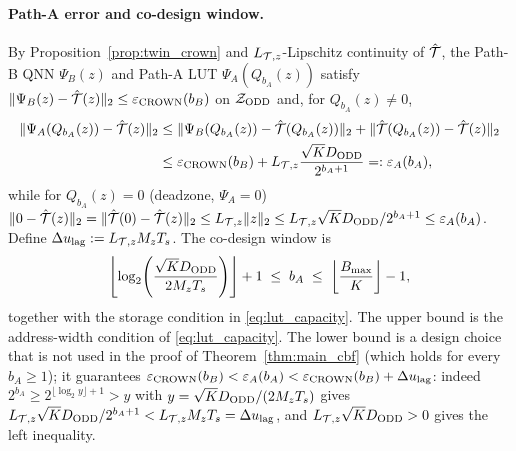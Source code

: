 \paragraph{Path-A error and co-design window.}
By Proposition~\ref{prop:twin_crown} and \(L_{\mathcal{T},z}\)-Lipschitz continuity of \(\hat{\mathcal{T}}\), the Path-B QNN \(\Psi_B(z)\) and Path-A LUT \(\Psi_A(Q_{b_A}(z))\) satisfy \(\|\Psi_B(z) - \hat{\mathcal{T}}(z)\|_2 \le \varepsilon_{\mathrm{CROWN}}(b_B)\) on \(\mathcal{Z}_{\mathrm{ODD}}\) and, for \(Q_{b_A}(z) \neq 0\),
\begin{equation}
\label{eq:eps_A_triangle}
\begin{aligned}
\|\Psi_A(Q_{b_A}(z)) - \hat{\mathcal{T}}(z)\|_2 &\le \|\Psi_B(Q_{b_A}(z)) - \hat{\mathcal{T}}(Q_{b_A}(z))\|_2 + \|\hat{\mathcal{T}}(Q_{b_A}(z)) - \hat{\mathcal{T}}(z)\|_2 \\
&\le \varepsilon_{\mathrm{CROWN}}(b_B) + L_{\mathcal{T},z}\frac{\sqrt{K}D_{\mathrm{ODD}}}{2^{b_A+1}} =: \varepsilon_A(b_A),
\end{aligned}
\end{equation}
while for \(Q_{b_A}(z) = 0\) (deadzone, \(\Psi_A = 0\)) \(\|0 - \hat{\mathcal{T}}(z)\|_2 = \|\hat{\mathcal{T}}(0) - \hat{\mathcal{T}}(z)\|_2 \le L_{\mathcal{T},z}\|z\|_2 \le L_{\mathcal{T},z}\sqrt{K}D_{\mathrm{ODD}}/2^{b_A+1} \le \varepsilon_A(b_A)\). Define \(\Delta u_{\mathrm{lag}} := L_{\mathcal{T},z} M_z T_s\). The co-design window is
\begin{equation}
\label{eq:codesign_window}
\left\lfloor \log_2\!\left(\frac{\sqrt{K}D_{\mathrm{ODD}}}{2 M_z T_s}\right) \right\rfloor + 1 \;\le\; b_A \;\le\; \left\lfloor \frac{B_{\max}}{K} \right\rfloor - 1 ,
\end{equation}
together with the storage condition in \eqref{eq:lut_capacity}. The upper bound is the address-width condition of \eqref{eq:lut_capacity}. The lower bound is a design choice that is not used in the proof of Theorem~\ref{thm:main_cbf} (which holds for every \(b_A \ge 1\)); it guarantees \(\varepsilon_{\mathrm{CROWN}}(b_B) < \varepsilon_A(b_A) < \varepsilon_{\mathrm{CROWN}}(b_B) + \Delta u_{\mathrm{lag}}\): indeed \(2^{b_A} \ge 2^{\lfloor \log_2 y\rfloor + 1} > y\) with \(y = \sqrt{K}D_{\mathrm{ODD}}/(2M_zT_s)\) gives \(L_{\mathcal{T},z}\sqrt{K}D_{\mathrm{ODD}}/2^{b_A+1} < L_{\mathcal{T},z} M_zT_s = \Delta u_{\mathrm{lag}}\), and \(L_{\mathcal{T},z}\sqrt KD_{\mathrm{ODD}} > 0\) gives the left inequality.

